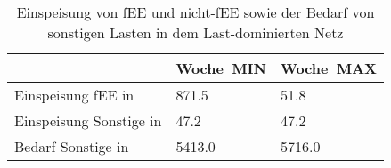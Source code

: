 {
\renewcommand{\arraystretch}{1.2}%
\begin{table}[H]
	\begin{center}
		\caption{Einspeisung von fEE und nicht-fEE sowie der Bedarf von sonstigen Lasten in dem Last-dominierten Netz}
		\begin{tabu} to 0.7\textwidth {X[2] X[1, r] X[1, r]}
			\toprule
											  & Woche~MIN      & Woche~MAX      \\ \midrule
			Einspeisung fEE in \si{\mwh}      & \num{871.5}  & \num{51.8}   \\
			Einspeisung Sonstige in \si{\mwh} & \num{47.2}   & \num{47.2}   \\
			Bedarf Sonstige  in \si{\mwh}     & \num{5413.0} & \num{5716.0} \\ \bottomrule
		\end{tabu}
		\label{tab:load_dominated_char}
	\end{center}
	\vspace{-3mm}%
\end{table}
}
